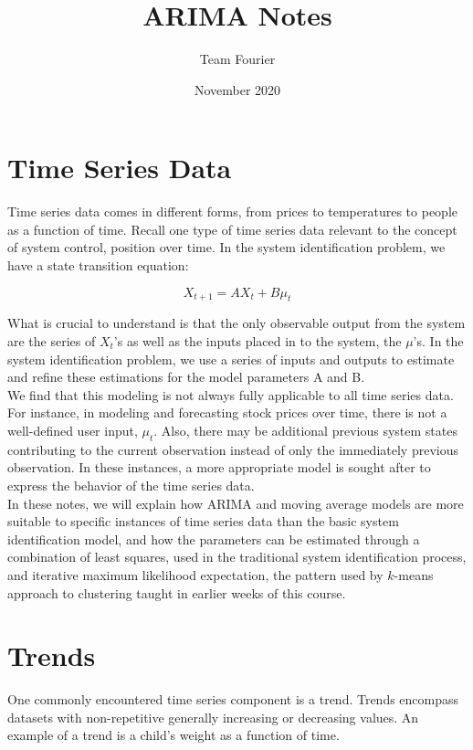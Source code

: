 \documentclass{article}
\title{ARIMA Notes}
\author{Team Fourier}
\date{November 2020}
\begin{document}
\maketitle
\section{Time Series Data}
Time series data comes in different forms, from prices to temperatures to people as a function of time. Recall one type of time series data relevant to the concept of system control, position over time. In the system identification problem, we have a state transition equation:

\begin{equation}\label{1}
X_{t+1} = AX_{t} + B\mu_{t}
\end{equation}

What is crucial to understand is that the only observable output from the system are the series of $X_{t}$'s as well as the inputs placed in to the system, the $\mu$'s. In the system identification problem, we use a series of inputs and outputs to estimate and refine these estimations for the model parameters A and B. \\

We find that this modeling is not always fully applicable to all time series data. For instance, in modeling and forecasting stock prices over time, there is not a well-defined user input, $\mu_{t}$. Also, there may be additional previous system states contributing to the current observation instead of only the immediately previous observation. In these instances, a more appropriate model is sought after to express the behavior of the time series data. \\

In these notes, we will explain how ARIMA and moving average models are more suitable to specific instances of time series data than the basic system identification model, and how the parameters can be estimated through a combination of least squares, used in the traditional system identification process, and iterative maximum likelihood expectation, the pattern used by $k$-means approach to clustering taught in earlier weeks of this course.

\maketitle
\section{Trends}
One commonly encountered time series component is a trend. Trends encompass datasets with non-repetitive generally increasing or decreasing values. An example of a trend is a child's weight as a function of time.
\end{document}
